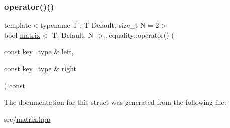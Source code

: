 \mbox{\label{structmatrix_1_1equality_a02ac97feafe27c33aa7af56977e5f538}} 
\subsubsection{\texorpdfstring{operator()()}{operator()()}}
{\footnotesize\ttfamily template$<$typename T , T Default, size\+\_\+t N = 2$>$ \\
bool \hyperlink{structmatrix}{matrix}$<$ T, Default, N $>$\+::equality\+::operator() (\begin{DoxyParamCaption}\item[{const \hyperlink{structmatrix_ae7906bda02f5d7f6744d9545c9465e13}{key\+\_\+type} \&}]{left,  }\item[{const \hyperlink{structmatrix_ae7906bda02f5d7f6744d9545c9465e13}{key\+\_\+type} \&}]{right }\end{DoxyParamCaption}) const\hspace{0.3cm}{\ttfamily [inline]}}



The documentation for this struct was generated from the following file\+:\begin{DoxyCompactItemize}
\item 
src/\hyperlink{matrix_8hpp}{matrix.\+hpp}\end{DoxyCompactItemize}
